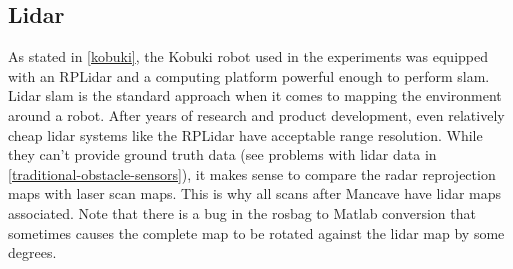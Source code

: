 \subsection{Lidar}\label{lidar-1}
As stated in \cref{kobuki}, the Kobuki robot used in the experiments was equipped with an RPLidar and a computing platform powerful enough to perform slam. Lidar slam is the standard approach when it comes to mapping the environment around a robot. After years of research and product development, even relatively cheap lidar systems like the RPLidar have acceptable range resolution. While they can't provide ground truth data (see problems with lidar data in \cref{traditional-obstacle-sensors}), it makes sense to compare the radar reprojection maps with laser scan maps. This is why all scans after Mancave have lidar maps associated.
Note that there is a bug in the rosbag to Matlab conversion that sometimes causes the complete map to be rotated against the lidar map by some degrees.
